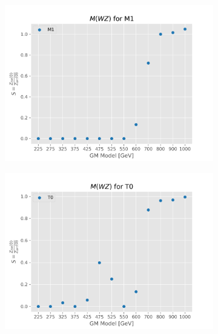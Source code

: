 \documentclass[../Bachelorarbeit.tex]{subfiles}
\begin{document}
\begin{figure}[h]
\begin{subfigure}{0.45\textwidth}
        \caption{}
    \end{subfigure}
    \begin{subfigure}{0.45\textwidth}
        \includegraphics[width=\textwidth]{Plots/gm_relevanze/MWZ_op_M1.png}
        \caption{}
    \end{subfigure}
    \begin{subfigure}{0.45\textwidth}
        \includegraphics[width=\textwidth]{Plots/gm_relevanze/MWZ_op_T0.png}
        \caption{}
    \end{subfigure}
    \begin{subfigure}{0.45\textwidth}

\end{subfigure}
\end{figure}
\end{document}
